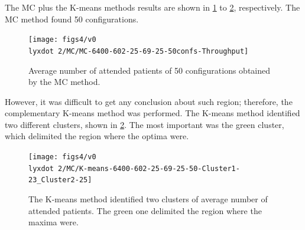 The MC plus the K-means methods results are shown in \ref{subfig:mc4-2}
to \ref{subfig:km4-2}, respectively. The MC method found 50 configurations.
\begin{figure}[H]
\centering{}\vspace*{-0.2cm}\texttt{[image: figs4/v0\\lyxdot 2/MC/MC-6400-602-25-69-25-50confs-Throughput]}\caption{Average number of attended patients of 50 configurations obtained
by the MC method.\label{subfig:mc4-2}}
\end{figure}
However, it was difficult to get any conclusion about such region;
therefore, the complementary K-means method was performed. The K-means
method identified two different clusters, shown in \ref{subfig:km4-2}.
The most important was the green cluster, which delimited the region
where the optima were.
\begin{figure}[H]
\begin{centering}
\vspace*{-0.2cm}\texttt{[image: figs4/v0\\lyxdot 2/MC/K-means-6400-602-25-69-25-50-Cluster1-23\_Cluster2-25]}
\par\end{centering}

\caption{The K-means method identified two clusters of average number of attended
patients. The green one delimited the region where the maxima were.\label{subfig:km4-2}}
\end{figure}

